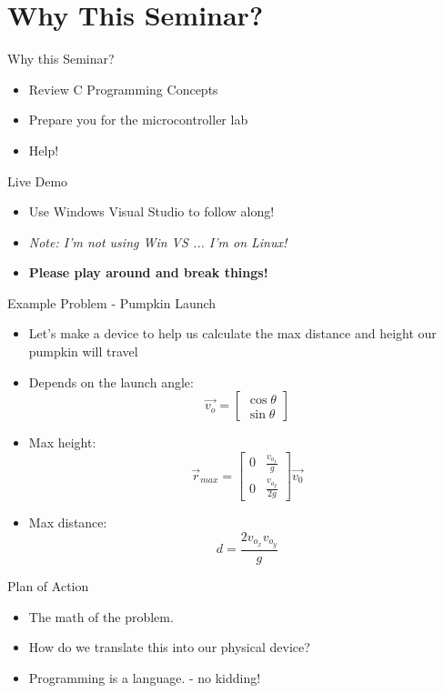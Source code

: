\documentclass[main.tex]{subfile}
\begin{document}
\section{Why This Seminar?} 
\label{sec:why_this_seminar_}
\begin{frame}{Why this Seminar?}
	\begin{itemize}
		\item Review C Programming Concepts
		\item Prepare you for the microcontroller lab
		\item Help!
	\end{itemize}
\end{frame}

\begin{frame}{Live Demo}
	\begin{itemize}
		\item Use Windows Visual Studio to follow along!
		\item \emph{Note: I'm not using Win VS ... I'm on Linux!}
		\item \textbf{Please play around and break things!}
	\end{itemize}
\end{frame}

\begin{frame}[fragile]{Example Problem - Pumpkin Launch}
	\begin{itemize}
		\item Let's make a device to help us calculate the max distance and height
				our pumpkin will travel
		\item Depends on the launch angle: 
			\[ \vec{v_{o}} = 
				\begin{bmatrix} \cos{\theta} \\ \sin{\theta} \end{bmatrix} 
			\]
		\item Max height: 
			\[
				\vec{r}_{max} = 
				\begin{bmatrix}
					   0 & \frac{v_{o_{x}}}{g}
					\\ 0 & \frac{v_{o_{y}}}{2 g}
				\end{bmatrix}\vec{v_0}
			\]
		\item Max distance: \[d = \frac{2 v_{o_{x}} v_{o_{y}}}{g}\]
	\end{itemize}
	
\end{frame}

\begin{frame}{Plan of Action}
	\begin{itemize}
		\item The math of the problem.
		\item How do we translate this into our physical device?
		\item Programming is a language. - no kidding!
	\end{itemize}
\end{frame}
\end{document}
